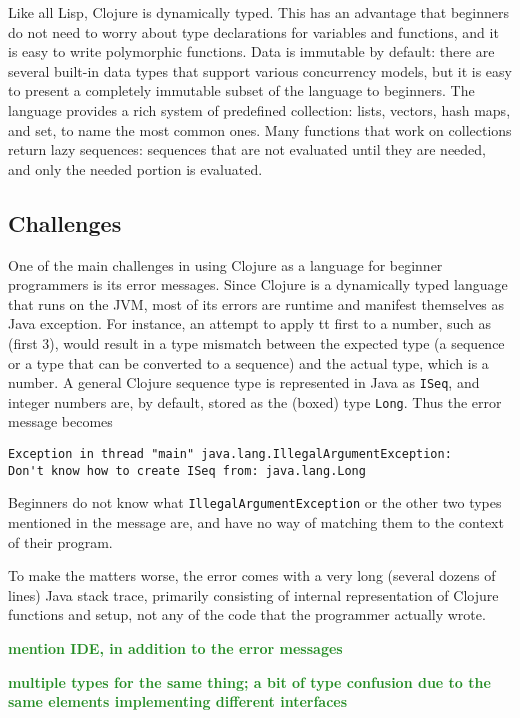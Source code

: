 \documentclass[submission,copyright,creativecommons]{eptcs}
\newcommand{\allcomments}[1]{{#1}}
\newcommand{\emcomment}[1]{{\bf \textcolor{ForestGreen}{\allcomments{{#1}}}}}
\begin{document}
Like all Lisp, Clojure is dynamically typed. This has an advantage that beginners do not need to worry about type declarations
for variables and functions, and it is easy to write polymorphic functions. 
Data is immutable by default: there are several built-in data types that support various concurrency models, 
but it is easy to present a completely immutable subset of the language to beginners. 
The language provides a rich system of predefined collection: lists, vectors, hash maps, and set, to name the 
most common ones. Many functions that work on collections return lazy sequences: sequences that are not evaluated 
until they are needed, and only the needed portion is evaluated. 

\subsection{Challenges}\label{subsec:challenges}
One of the main challenges in using Clojure as a language for beginner programmers is its error messages. 
Since Clojure is a dynamically typed language that runs on the JVM, most of its errors
are runtime and manifest themselves as Java exception.
For instance, an attempt to apply {tt first} to a number, such as {(first 3)}, 
would result in a type mismatch between the expected type (a sequence or a type that can be converted to a sequence) 
and the actual type, which is a number. A general Clojure sequence type  is represented in Java as 
{\tt ISeq}, and integer numbers are, by default, stored as the (boxed) type {\tt Long}. Thus the error message becomes
\begin{verbatim}
Exception in thread "main" java.lang.IllegalArgumentException:
Don't know how to create ISeq from: java.lang.Long
\end{verbatim}
Beginners do not know what {\tt IllegalArgumentException} or the other two types mentioned in the message are, and have no
way of matching them to the context of their program. 

To make the matters worse, the error comes with a very long (several dozens of lines) Java stack trace, primarily consisting of internal 
representation of Clojure functions and setup, not any of the code that the programmer actually wrote. 



\emcomment{mention IDE, in addition to the error messages}

\emcomment{multiple types for the same thing; a bit of type confusion due to the same elements implementing different interfaces}
\end{document}

